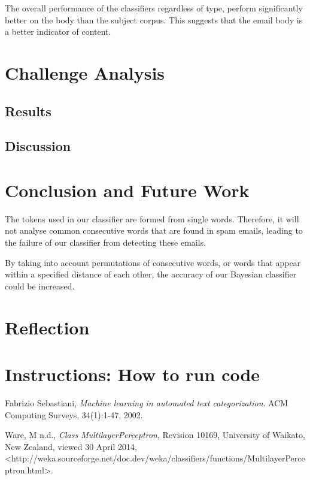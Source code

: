 \documentclass[10pt, a4paper]{article}
\begin{document}
The overall performance of the classifiers regardless of type, perform significantly better on the body than the subject corpus. This suggests that the email body is a better indicator of content.

\section{Challenge Analysis}


\subsection{Results}

\subsection{Discussion}

\section{Conclusion and Future Work}

The tokens used in our classifier are formed from single words. Therefore, it will not analyse common consecutive words that are found in spam emails, leading to the failure of our classifier from detecting these emails.

By taking into account permutations of consecutive words, or words that appear within a specified distance of each other, the accuracy of our Bayesian classifier could be increased.

\section{Reflection}

\section{Instructions: How to run code}

\begin{thebibliography}{9}

  Fabrizio Sebastiani,
  \emph{Machine learning in automated text categorization}.
  ACM Computing Surveys,
  34(1):1-47,
  2002.

  Ware, M n.d., \emph{Class MultilayerPerceptron}, Revision 10169, University of Waikato, New Zealand, viewed 30 April 2014, <http://weka.sourceforge.net/doc.dev/weka/classifiers/functions/MultilayerPerceptron.html>.

\end{thebibliography}
\end{document}
